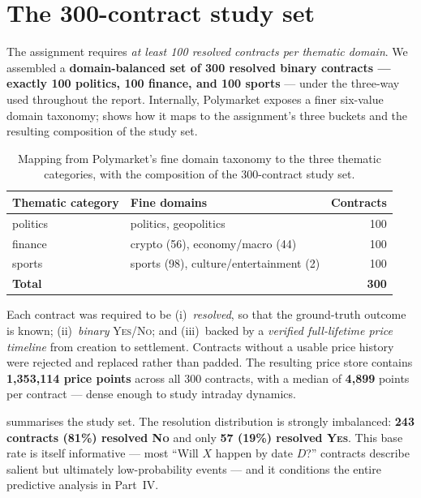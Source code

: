\section{The 300-contract study set}
\label{sec:studyset}
The assignment requires \emph{at least 100 resolved contracts per thematic domain}.
We assembled a \textbf{domain-balanced set of 300 resolved binary contracts ---
exactly 100 politics, 100 finance, and 100 sports} --- under the three-way
 used throughout the report. Internally, Polymarket exposes
a finer six-value domain taxonomy;  shows how it maps to the
assignment's three buckets and the resulting composition of the study set.

\begin{table}[H]
\centering
\caption[Fine domain to thematic-category mapping]{Mapping from Polymarket's fine domain
taxonomy to the three thematic categories, with the composition of the 300-contract
study set.}
\label{tab:domain-map}
\small
\begin{tabular}{@{}l l r@{}}
\toprule
\textbf{Thematic category} & \textbf{Fine domains} & \textbf{Contracts}\\
\midrule
politics & politics, geopolitics & 100\\
finance  & crypto (56), economy/macro (44) & 100\\
sports   & sports (98), culture/entertainment (2) & 100\\
\midrule
\textbf{Total} & & \textbf{300}\\
\bottomrule
\end{tabular}
\end{table}

Each contract was required to be (i)~\emph{resolved}, so that the ground-truth outcome
is known; (ii)~\emph{binary} \textsc{Yes}/\textsc{No}; and (iii)~backed by a
\emph{verified full-lifetime price timeline} from creation to settlement. Contracts
without a usable price history were rejected and replaced rather than padded. The
resulting price store contains \textbf{1{,}353{,}114 price points} across all
300 contracts, with a median of \textbf{4{,}899} points per contract --- dense enough
to study intraday dynamics.

 summarises the study set. The resolution distribution is
strongly imbalanced: \textbf{243 contracts (81\%) resolved \textsc{No}} and only
\textbf{57 (19\%) resolved \textsc{Yes}}. This base rate is itself informative ---
most ``Will $X$ happen by date $D$?'' contracts describe salient but ultimately
low-probability events --- and it conditions the entire predictive analysis in
Part~IV.

